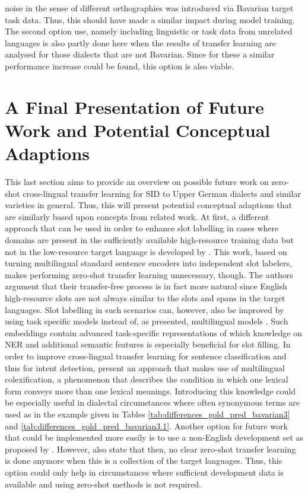 \documentclass[11pt,a4paper,twoside,openright]{scrbook}
\begin{document}
noise in the sense of different orthographies was introduced via Bavarian target task data. Thus, this should have made a similar impact during model training. The second option \citet{srivastava-chiang-2023-fine} use, namely including linguistic or task data from unrelated languages is also partly done here when the results of transfer learning are analysed for those dialects that are not Bavarian. Since for these a similar performance increase could be found, this option is also viable.






\section{A Final Presentation of Future Work and Potential Conceptual Adaptions}

This last section aims to provide an overview on possible future work on zero-shot cross-lingual transfer learning for SID to Upper German dialects and similar varieties in general. Thus, this will present potential conceptual adaptions that are similarly based upon concepts from related work. At first, a different approach that can be used in order to enhance slot labelling in cases where domains are present in the sufficiently available high-resource training data but not in the low-resource target language is developed by \citet{razumovskaia-etal-2023-transfer}. This work, based on turning multilingual standard sentence encoders into independent slot labelers, makes performing zero-shot transfer learning unnecessary, though. The authors argument that their transfer-free process is in fact more natural since English high-resource slots are not always similar to the slots and spans in the target languages. Slot labelling in such scenarios can, however, also be improved by using task specific models instead of, as presented, multilingual models \citep{louvan-magnini-2020-recent}. Such embeddings contain advanced task-specific representations of which knowledge on NER and additional semantic features is especially beneficial for slot filling. In order to improve cross-lingual transfer learning for sentence classification and thus for intent detection, \citet{liu-etal-2023-crosslingual-transfer} present an approach that makes use of multilingual colexification, a phenomenon that describes the condition in which one lexical form conveys more than one lexical meanings. Introducing this knowledge could be especially useful in dialectal circumstances where often synonymous terms are used as in the example given in Tables \ref{tab:differences_gold_pred_bavarian3} and \ref{tab:differences_gold_pred_bavarian3.1}. Another option for future work that could be implemented more easily is to use a non-English development set as proposed by \citet{keung-etal-2020-dont}. However, \citet{van-der-goot-etal-2021-masked} also state that then, no clear zero-shot transfer learning is done anymore when this is a collection of the target languages. Thus, this option could only help in circumstances where sufficient development data is available and using zero-shot methods is not required. 
\end{document}
